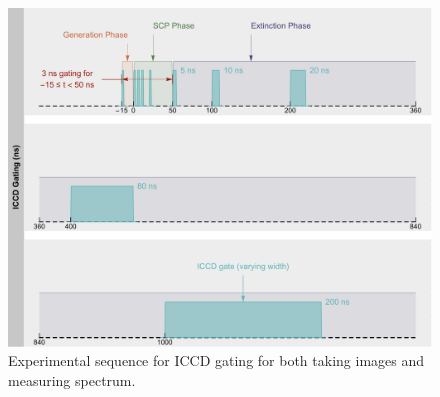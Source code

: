 \begin{figure}[ht!]
\centering
\includegraphics[width=130mm]{figures/ap4/sequence/gatingSequence.pdf}
\caption{Experimental sequence for ICCD gating for both taking images and measuring spectrum.}
\label{fig:gatingSequence}
\end{figure}
